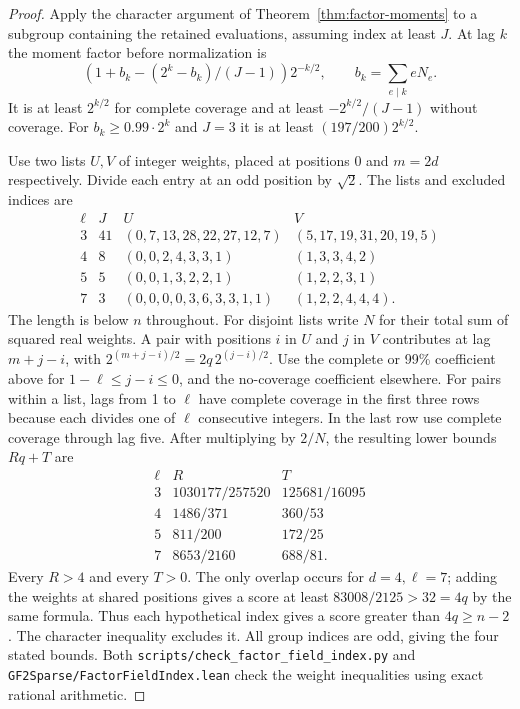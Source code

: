 \documentclass[11pt]{article}
\begin{document}
\begin{proof}
Apply the character argument of Theorem~\ref{thm:factor-moments}
to a subgroup containing the retained evaluations, assuming index at
least \(J\). At lag \(k\) the moment factor before normalization is
\[
 (1+b_k-(2^k-b_k)/(J-1))2^{-k/2},\qquad
 b_k=\sum_{e\mid k} eN_e .
\]
It is at least \(2^{k/2}\) for complete coverage and at least
\(-2^{k/2}/(J-1)\) without coverage. For \(b_k\ge0.99\cdot2^k\)
and \(J=3\) it is at least \((197/200)2^{k/2}\).

Use two lists \(U,V\) of integer weights, placed at positions 0
and \(m=2d\) respectively. Divide each entry at an odd position
by \(\sqrt2\). The lists and excluded indices are
\[
\begin{array}{c|r|l|l}
\ell&J&U&V\\\hline
3&41&(0,7,13,28,22,27,12,7)&(5,17,19,31,20,19,5)\\
4&8 &(0,0,2,4,3,3,1)&(1,3,3,4,2)\\
5&5 &(0,0,1,3,2,2,1)&(1,2,2,3,1)\\
7&3 &(0,0,0,0,3,6,3,3,1,1)&(1,2,2,4,4,4).
\end{array}
\]
The length is below \(n\) throughout. For disjoint lists write
\(N\) for their total sum of squared real weights. A pair with
positions \(i\) in \(U\) and \(j\) in \(V\) contributes at lag
\(m+j-i\), with \(2^{(m+j-i)/2}=2q\,2^{(j-i)/2}\).
Use the complete or 99\% coefficient above for
\(1-\ell\le j-i\le0\), and the no-coverage coefficient elsewhere.
For pairs within a list, lags from 1 to \(\ell\) have complete coverage
in the first three rows because each divides one of \(\ell\) consecutive
integers. In the last row use complete coverage through lag five.
After multiplying by \(2/N\), the resulting lower bounds \(Rq+T\) are
\[
\begin{array}{c|r|r}
\ell&R&T\\\hline
3&1030177/257520&125681/16095\\
4&1486/371&360/53\\
5&811/200&172/25\\
7&8653/2160&688/81 .
\end{array}
\]
Every \(R>4\) and every \(T>0\). The only overlap occurs for
\(d=4,\ell=7\); adding the weights at shared positions gives a score
at least \(83008/2125>32=4q\) by the same formula. Thus each
hypothetical index gives a score greater than \(4q\ge n-2\).
The character inequality excludes it. All group indices are odd,
giving the four stated bounds. Both \nolinkurl{scripts/check_factor_field_index.py}
and \nolinkurl{GF2Sparse/FactorFieldIndex.lean} check the weight inequalities
using exact rational arithmetic.
\end{proof}
\end{document}
